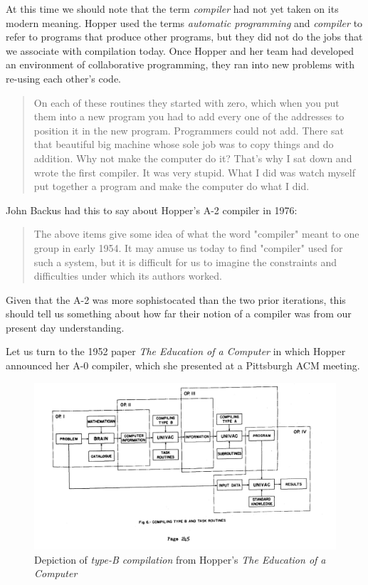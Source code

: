 At this time we should note that the term \textit{compiler} had not yet taken on its modern meaning.
Hopper used the terms \textit{automatic programming} and \textit{compiler} to refer to programs
that produce other programs, but they did not do the jobs that we associate with compilation today.
Once Hopper and her team had developed an environment of collaborative programming, they
ran into new problems with re-using each other's code.

\begin{quotation}
On each of these routines they started with zero, which when you put them into 
a new program you had to add every one of the addresses to position it in the 
new program. Programmers could not add.  There sat that beautiful big machine 
whose sole job was to copy things and do addition. Why not make the computer do 
it? That's why I sat down and wrote the first compiler. It was very stupid. 
What I did was watch myself put together a program and make the computer do 
what I did. 
\cite{Hopper_1980_Oral_History}
\end{quotation}

John Backus had this to say about Hopper's A-2 compiler in 1976:
\begin{quotation}
The above items give some idea of what the word "compiler" meant to one
group in early 1954. It may amuse us today to find "compiler" used for such
a system, but it is difficult for us to imagine the constraints and difficulties
under which its authors worked.
\cite{Backus_1980_Programming_in_America_in_1950s}
\end{quotation}

Given that the A-2 was more sophistocated than the two prior iterations,
this should tell us something about how far their notion of a compiler was
from our present day understanding.

Let us turn to the 1952 paper \textit{The Education of a Computer}
in which Hopper announced her A-0 compiler,
which she presented at a Pittsburgh ACM meeting\cite{education_of_a_computer_1952_hopper}.


\begin{figure}[h]
    \centering
    \includegraphics[width=.7\textwidth]{resource/gh_education_of_a_computer_type_fig_6.png}
    \caption{Depiction of \textit{type-B compilation} from Hopper's \textit{The Education of a Computer}}
    \label{fig:education-of-a-computer-1952-hopper-f6}
\end{figure}

